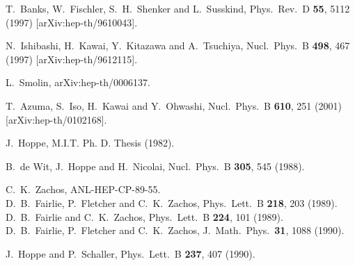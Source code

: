 \documentclass[a4paper,12pt]{article}
\begin{document}
\begin{thebibliography}{99}
	T.~Banks, W.~Fischler, S.~H.~Shenker and L.~Susskind,
	Phys.\ Rev.\ D {\bf 55}, 5112 (1997)
	[arXiv:hep-th/9610043].

	N.~Ishibashi, H.~Kawai, Y.~Kitazawa and A.~Tsuchiya,
	Nucl.\ Phys.\ B {\bf 498}, 467 (1997)
	[arXiv:hep-th/9612115].

	L.~Smolin,
	arXiv:hep-th/0006137.

	T.~Azuma, S.~Iso, H.~Kawai and Y.~Ohwashi,
	Nucl.\ Phys.\ B {\bf 610}, 251 (2001)
	[arXiv:hep-th/0102168].

	 J.~Hoppe, M.I.T. Ph. D. Thesis (1982).

	B.~de Wit, J.~Hoppe and H.~Nicolai,
	Nucl.\ Phys.\ B {\bf 305}, 545 (1988).

	C.~K.~Zachos,
	ANL-HEP-CP-89-55.\\
	D.~B.~Fairlie, P.~Fletcher and C.~K.~Zachos,
	Phys.\ Lett.\ B {\bf 218}, 203 (1989).
	\\ %
	D.~B.~Fairlie and C.~K.~Zachos,
	Phys.\ Lett.\ B {\bf 224}, 101 (1989).
	\\ %
	D.~B.~Fairlie, P.~Fletcher and C.~K.~Zachos,
	J.\ Math.\ Phys.\  {\bf 31}, 1088 (1990).

	J.~Hoppe and P.~Schaller,
	Phys.\ Lett.\ B {\bf 237}, 407 (1990).


\end{thebibliography}
\end{document}
